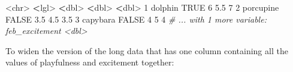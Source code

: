 \documentclass[
]{book}
\newenvironment{Shaded}{\begin{snugshade}}{\end{snugshade}}
\newcommand{\CommentTok}[1]{\textcolor[rgb]{0.56,0.35,0.01}{\textit{#1}}}
\newcommand{\ConstantTok}[1]{\textcolor[rgb]{0.00,0.00,0.00}{#1}}
\newcommand{\DecValTok}[1]{\textcolor[rgb]{0.00,0.00,0.81}{#1}}
\newcommand{\ErrorTok}[1]{\textcolor[rgb]{0.64,0.00,0.00}{\textbf{#1}}}
\newcommand{\FloatTok}[1]{\textcolor[rgb]{0.00,0.00,0.81}{#1}}
\newcommand{\NormalTok}[1]{#1}
\newcommand{\SpecialCharTok}[1]{\textcolor[rgb]{0.00,0.00,0.00}{#1}}
\begin{document}
\begin{Shaded}
\begin{Highlighting}[]
  \SpecialCharTok{\textless{}}\NormalTok{chr}\SpecialCharTok{\textgreater{}}     \ErrorTok{\textless{}}\NormalTok{lgl}\SpecialCharTok{\textgreater{}}                    \ErrorTok{\textless{}}\NormalTok{dbl}\SpecialCharTok{\textgreater{}}           \ErrorTok{\textless{}}\NormalTok{dbl}\SpecialCharTok{\textgreater{}}          \ErrorTok{\textless{}}\NormalTok{dbl}\SpecialCharTok{\textgreater{}}
\DecValTok{1}\NormalTok{ dolphin   }\ConstantTok{TRUE}                       \DecValTok{6}               \FloatTok{5.5}            \DecValTok{7}  
\DecValTok{2}\NormalTok{ porcupine }\ConstantTok{FALSE}                      \FloatTok{3.5}             \FloatTok{4.5}            \FloatTok{3.5}
\DecValTok{3}\NormalTok{ capybara  }\ConstantTok{FALSE}                      \DecValTok{4}               \DecValTok{5}              \DecValTok{4}  
\CommentTok{\# ... with 1 more variable: feb\_excitement \textless{}dbl\textgreater{}}
\end{Highlighting}
\end{Shaded}

To widen the version of the long data that has one column containing all the values of playfulness and excitement together:
\end{document}
